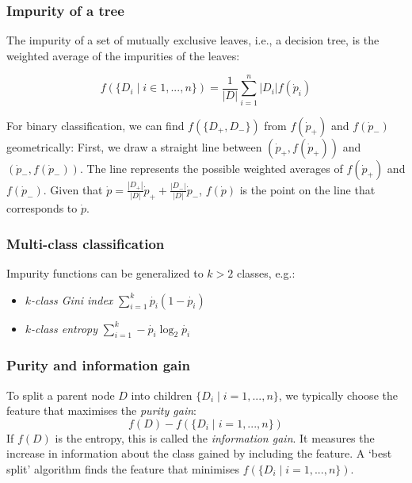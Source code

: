 \subsubsection{Impurity of a tree}

The impurity of a set of mutually exclusive leaves, i.e., a decision tree, is the weighted average of the impurities of the leaves:

\begin{equation}
  \label{eqnImpurityTree}
  f(\{ D_i \mid i \in 1, ..., n \}) = \frac{1}{|D|} \sum_{i = 1}^n |D_i| f(\dot{p}_i)
\end{equation}

For binary classification, we can find $f(\{ D_+, D_- \})$ from $f(\dot{p}_+)$ and $f(\dot{p}_-)$ geometrically:
First, we draw a straight line between $(\dot{p}_+, f(\dot{p}_+))$ and $(\dot{p}_-, f(\dot{p}_-))$.
The line represents the possible weighted averages of $f(\dot{p}_+)$ and $f(\dot{p}_-)$.
Given that $\dot{p} = \frac{|D_+|}{|D|} \dot{p}_+ + \frac{|D_-|}{|D|} \dot{p}_-$, $f(\dot{p})$ is the point on the line that corresponds to $\dot{p}$.

\subsubsection{Multi-class classification}

Impurity functions can be generalized to $k > 2$ classes, e.g.:
\begin{itemize}
  \item \textit{$k$-class Gini index} $\sum_{i = 1}^k \dot{p_i} (1 - \dot{p_i})$
  \item \textit{$k$-class entropy} $\sum_{i = 1}^k - \dot{p_i} \log_2 \dot{p_i}$
\end{itemize}
\subsubsection{Purity and information gain}

To split a parent node $D$ into children $\{ D_i \mid i = 1, ..., n \}$, we typically choose the feature that maximises the \textit{purity gain}:
\begin{equation}
  f(D) - f(\{ D_i \mid i = 1, ..., n \})
\end{equation}
If $f(D)$ is the entropy, this is called the \textit{information gain}.
It measures the increase in information about the class gained by including the feature.
A `best split' algorithm finds the feature that minimises $f(\{ D_i \mid i = 1, ..., n \})$.


